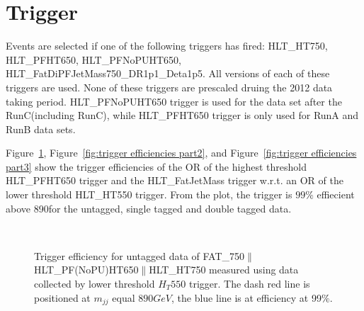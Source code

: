 \newpage

\section{Trigger}
\label{sec:trigger}


Events are selected if one of the following triggers has fired: HLT\_HT750, HLT\_PFHT650, HLT\_PFNoPUHT650,
HLT\_FatDiPFJetMass750\_DR1p1\_Deta1p5.  All versions of each of these triggers are used. None of these triggers are prescaled druing the 2012 data taking period. HLT\_PFNoPUHT650 trigger is used for the data set after the RunC(including RunC), while HLT\_PFHT650
trigger is only used for RunA and RunB data sets. 


Figure~\ref{fig:trigger efficiencies part1}, Figure~\ref{fig:trigger efficiencies part2}, and Figure~\ref{fig:trigger efficiencies part3} show the trigger efficiencies of the OR of the highest threshold HLT\_PFHT650 trigger and the HLT\_FatJetMass trigger w.r.t. an OR of the lower threshold HLT\_HT550 trigger. From the plot, the trigger is $99\%$ effiecient above 890\GeVcc for the untagged, single tagged and double tagged data. 


\begin{figure}[htb]
\centering
      \\   
\caption[Trigger efficiencies]{Trigger efficiency for untagged data of FAT\_750$\parallel$HLT\_PF(NoPU)HT650$\parallel$HLT\_HT750 measured using data collected by lower threshold $H_T550$ trigger. The dash red line is positioned at $m_{jj}$ equal $890 GeV$, the blue line is at efficiency at 99$\%$. }
  \label{fig:trigger efficiencies part1}
\end{figure}

